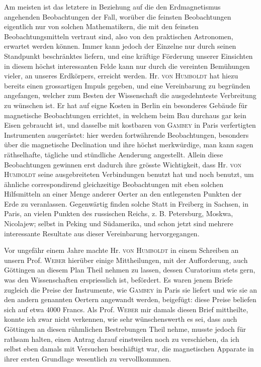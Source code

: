 Am meisten ist das letztere in Beziehung auf die den Erdmagnetismus
angehenden Beobachtungen der Fall, worüber die feinsten Beobachtungen
\clearpage{}
\noindent eigentlich nur von solchen Mathematikern, die mit den feinsten Beobachtungsmitteln
vertraut sind, also von den praktischen Astronomen, erwartet werden
können. Immer kann jedoch der Einzelne nur durch seinen Standpunkt beschränktes
liefern, und eine kräftige Förderung unserer Einsichten in diesem
höchst interessanten Felde kann nur durch die vereinten Bemühungen vieler,
an  unseres Erdkörpers, erreicht werden. Hr. \textsc{von Humboldt}
hat hiezu bereits einen grossartigen Impuls gegeben, und eine Vereinbarung
zu begründen angefangen, welcher zum Besten der Wissenschaft die
ausgedehnteste Verbreitung zu wünschen ist. Er hat auf eigne Kosten in
Berlin ein besonderes Gebäude für magnetische Beobachtungen errichtet, in
welchem beim Bau durchaus gar kein Eisen gebraucht ist, und dasselbe mit
kostbaren von \textsc{Gambey} in Paris verfertigten Instrumenten ausgerüstet: hier
werden fortwährende Beobachtungen, besonders über die magnetische Declination
und ihre höchst merkwürdige, man kann sagen räthselhafte, tägliche
und stündliche Aenderung angestellt. Allein diese Beobachtungen gewinnen
erst dadurch ihre grösste Wichtigkeit, dass Hr. \textsc{von Humboldt} seine ausgebreiteten
Verbindungen benutzt hat und noch benutzt, um ähnliche correspondirend
gleichzeitige Beobachtungen mit eben solchen Hilfsmitteln an einer
Menge anderer Oerter an den entlegensten Punkten der Erde zu veranlassen.
Gegenwärtig finden solche Statt in Freiberg in Sachsen, in Paris, an vielen
Punkten des russischen Reichs, z. B. Petersburg, Moskwa, Nicolajew; selbst
in Peking und Südamerika, und schon jetzt sind mehrere interessante Resultate
aus dieser Vereinbarung hervorgegangen.

Vor ungefähr einem Jahre machte Hr. \textsc{von Humboldt} in einem Schreiben
an unsern Prof. \textsc{Weber} hierüber einige Mittheilungen, mit der Aufforderung,
auch Göttingen an diesem Plan Theil nehmen zu lassen, dessen Curatorium
stets gern, was den Wissenschaften erspriesslich ist, befördert. Es waren jenem
Briefe zugleich die Preise der Instrumente, wie \textsc{Gambey} in Paris sie liefert
und wie sie an den andern genannten Oertern angewandt werden, beigefügt:
diese Preise beliefen sich auf etwa 4000 Francs. Als Prof. \textsc{Weber} mir damals
diesen Brief mittheilte, konnte ich zwar nicht verkennen, wie sehr wünschenswerth
es sei, dass auch Göttingen an diesen rühmlichen Bestrebungen Theil
nehme, musste jedoch für rathsam halten, einen Antrag darauf einstweilen
noch zu verschieben, da ich selbst eben damals mit Versuchen beschäftigt
\clearpage{}
\noindent war, die magnetischen Apparate in ihrer ersten Grundlage wesentlich zu vervollkommnen.

